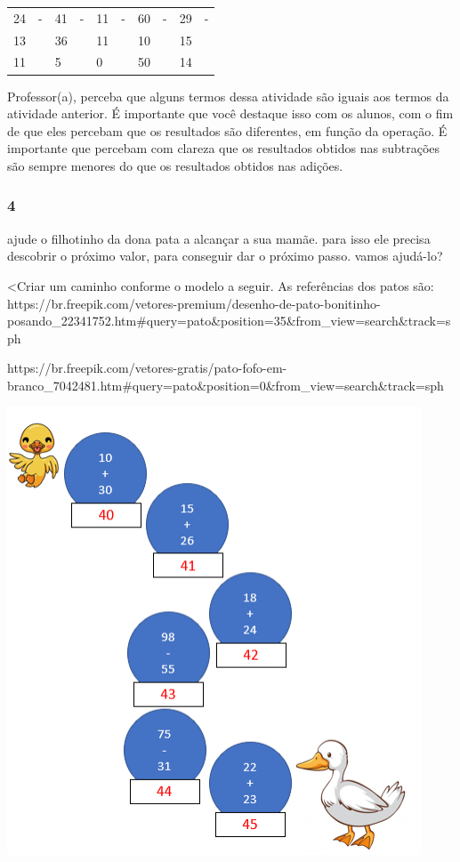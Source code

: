\begin{longtable}[]{@{}llllllllll@{}}
\toprule
24 & - & 41 & - & 11 & - & 60 & - & 29 & -\tabularnewline
13 & & 36 & & 11 & & 10 & & 15 &\tabularnewline
11 & & 5 & & 0 & & 50 & & 14 &\tabularnewline
\bottomrule
\end{longtable}

Professor(a), perceba que alguns termos dessa atividade são iguais aos
termos da atividade anterior. É importante que você destaque isso com os
alunos, com o fim de que eles percebam que os resultados são diferentes,
em função da operação. É importante que percebam com clareza que os
resultados obtidos nas subtrações são sempre menores do que os
resultados obtidos nas adições.

\subsubsection{4}\label{section-11}

ajude o filhotinho da dona pata a alcançar a sua mamãe. para isso ele
precisa descobrir o próximo valor, para conseguir dar o próximo passo.
vamos ajudá-lo?

\textless{}Criar um caminho conforme o modelo a seguir. As referências
dos patos são:
https://br.freepik.com/vetores-premium/desenho-de-pato-bonitinho-posando\_22341752.htm\#query=pato\&position=35\&from\_view=search\&track=sph

https://br.freepik.com/vetores-gratis/pato-fofo-em-branco\_7042481.htm\#query=pato\&position=0\&from\_view=search\&track=sph

\includegraphics[width=4.84443in,height=5.24031in]{media/image17.png}

